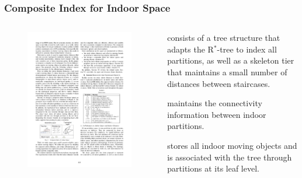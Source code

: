 \begin{frame}
\frametitle{Composite Index for Indoor Space}

\begin{columns}[c]

  \begin{figure}[tb]
    \includegraphics[width=\columnwidth]{figures/2-6/2-6-8.pdf}
  \end{figure}

  \begin{fitemize}
    \item {} consists of a tree structure that adapts the R$^*$-tree to index all partitions, as well as a skeleton tier that maintains a small number of distances between staircases.
    \item {} maintains the connectivity information between indoor partitions.
    \item {} stores all indoor moving objects and is associated with the tree through partitions at its leaf level.
  \end{fitemize}

\end{columns}

\end{frame}


